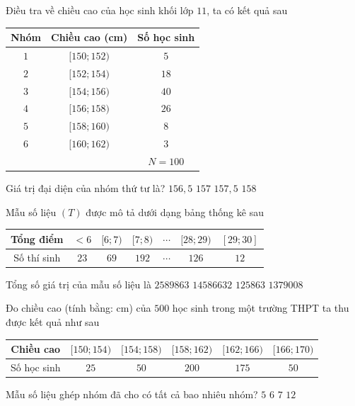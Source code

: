 \begin{ex}%
	 Điều tra về chiều cao của học sinh khối lớp $11$, ta có kết quả sau
	\begin{center}
		\begin{tabular}{|c|c|c|}
			 \hline
			Nhóm & Chiều cao  (cm) & Số học sinh \\
			 \hline
			$1$ & $[150;152)$ & $5$  \\
			\hline 
			$2$ & $[152;154)$  & $18$ \\
			 \hline
			$3$ & $[154;156)$  & $40$ \\
			\hline 
			$4$  & $[156;158)$ & $26$ \\
			\hline 
			$5$ & $[158;160)$ & $8$  \\
			\hline 
			$6$ & $[160;162)$ & $3$  \\
			\hline 
			\multicolumn{2}{|c|}{} & $N=100$  \\
			\hline 
		\end{tabular}
	\end{center}
	 Giá trị đại diện của nhóm thứ tư là?
	\choice 
		{$156{,}5$} 
		{\True$157$} 
		 {$157{,}5$}
		{$158$} 
\end{ex}

\begin{ex}%
	Mẫu số liệu $(T)$ được mô tả dưới dạng bảng thống kê  sau
	\begin{center}
		\begin{tabular}{|c|c|c|c|c|c|c|}
			\hline 
			Tổng điểm & $< 6$ &  $[6;7)$ & $[7;8)$ & $\cdots$ & $[28;29)$ & $[29;30]$ \\
			 \hline
			Số thí sinh & $23$ & $69$ & $192$ & $\cdots$ & $126$ & $12$  \\ \hline
		\end{tabular}
	\end{center}
	Tổng số giá trị của mẫu  số liệu là
	 \choice
		{$2589863$} 
		 {$14586632$}
		{$125863$} 
		{\True  $1379008$}
\end{ex}

\begin{ex}%
	Đo chiều cao (tính bằng: cm) của $500$ học sinh trong một trường THPT  ta thu được kết quả như sau
	\begin{center}
		\begin{tabular}{|c|c|c|c|c|c|}
			\hline 
			Chiều  cao & $[150;154)$ & $[154;158)$ & $[158;162)$ & $[162;166)$ & $[166;170)$ \\
			\hline 
			 Số học sinh & $25$ & $50$ & $200$ & $175$ & $50$ \\
			\hline 
		\end{tabular}
	\end{center}
	Mẫu số liệu ghép nhóm đã  cho có tất cả bao nhiêu nhóm?
	 \choice
		{\True  $5$}
		{$6$} 
		 {$7$}
		{$12$} 
\end{ex}

